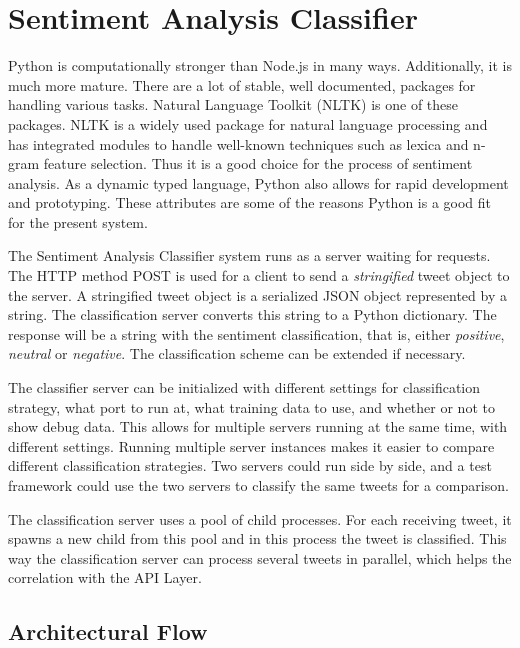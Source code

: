 \section{Sentiment Analysis Classifier}

Python is computationally stronger than Node.js in many ways. Additionally, it is much more mature. There are a lot of stable, well documented, packages for handling various tasks. Natural Language Toolkit (NLTK) is one of these packages. NLTK is a widely used package for natural language processing and has integrated modules to handle well-known techniques such as lexica and n-gram feature selection. Thus it is a good choice for the process of sentiment analysis. As a dynamic typed language, Python also allows for rapid development and prototyping. These attributes are some of the reasons Python is a good fit for the present system. 

The Sentiment Analysis Classifier system runs as a server waiting for requests. The HTTP method POST is used for a client to send a \textit{stringified} tweet object to the server. A stringified tweet object is a serialized JSON object represented by a string. The classification server converts this string to a Python dictionary. The response will be a string with the sentiment classification, that is, either \textit{positive}, \textit{neutral} or \textit{negative}. The classification scheme can be extended if necessary. 

The classifier server can be initialized with different settings for classification strategy, what port to run at, what training data to use, and whether or not to show debug data. This allows for multiple servers running at the same time, with different settings. Running multiple server instances makes it easier to compare different classification strategies. Two servers could run side by side, and a test framework could use the two servers to classify the same tweets for a comparison.

The classification server uses a pool of child processes. For each receiving tweet, it spawns a new child from this pool and in this process the tweet is classified. This way the classification server can process several tweets in parallel, which helps the correlation with the API Layer.

\subsection{Architectural Flow}

